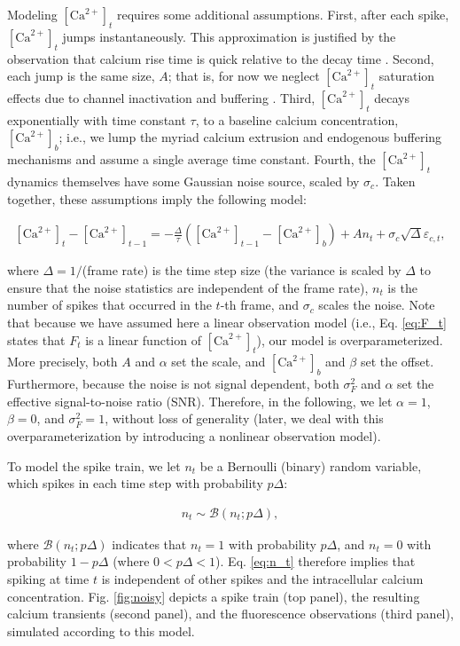 \documentclass[10pt]{article}
\newcommand{\Ca}{[\text{Ca}^{2+}]}
\begin{document}
Modeling $\Ca_t$ requires some additional assumptions. First, after each spike, $\Ca_t$ jumps instantaneously. This approximation is justified by the observation that calcium rise time is quick relative to the decay time \cite{YasudaSvoboda04, CornelisseMansvelder07}. Second, each jump is the same size, $A$; that is, for now we neglect $\Ca_t$ saturation effects due to channel inactivation and buffering \cite{RegehrAtluri95}. Third, $\Ca_t$ decays exponentially with time constant $\tau$, to a baseline calcium concentration, $\Ca_b$; i.e., we lump the myriad calcium extrusion and endogenous buffering mechanisms and assume a single average time constant. Fourth, the $\Ca_t$ dynamics themselves have some Gaussian noise source, scaled by $\sigma_c$. Taken together, these assumptions imply the following model:

\begin{align} \label{eq:C_t}
\Ca_t - \Ca_{t-1} = -\frac{\Delta}{\tau}(\Ca_{t-1}-\Ca_b) + A n_t + \sigma_c \sqrt{\Delta} \varepsilon_{c,t},%
\end{align}

\noindent where $\Delta=1/$(frame rate) is the time step size (the variance is scaled by $\Delta$ to ensure that the noise statistics are independent of the frame rate), $n_t$ is the number of spikes that occurred in the $t$-th frame, and $\sigma_c$ scales the noise. Note that because we have assumed here a linear observation model (i.e., Eq. \ref{eq:F_t} states that $F_t$ is a linear function of $\Ca_t$), our model is overparameterized. More precisely, both $A$ and $\alpha$ set the scale, and $\Ca_b$ and $\beta$ set the offset. Furthermore, because the noise is not signal dependent, both $\sigma_F^2$ and $\alpha$ set the effective signal-to-noise ratio (SNR).  Therefore, in the following, we let $\alpha=1$, $\beta=0$, and $\sigma_F^2=1$, without loss of generality (later, we deal with this overparameterization by introducing a nonlinear observation model). 

To model the spike train, we let $n_t$ be a Bernoulli (binary) random variable, which spikes in each time step with probability $p \Delta$:

\begin{align} \label{eq:n_t}
n_t \sim \mathcal{B}(n_t; p \Delta),
\end{align}

\noindent where $\mathcal{B}(n_t;p \Delta)$ indicates that $n_t=1$ with probability $p \Delta$, and $n_t=0$ with probability $1-p \Delta$ (where $0 <p \Delta < 1$). Eq. \ref{eq:n_t} therefore implies that spiking at time $t$ is independent of other spikes and the intracellular calcium concentration. Fig. \ref{fig:noisy} depicts a spike train (top panel), the resulting calcium transients (second panel), and the fluorescence observations (third panel), simulated according to this model.
\end{document}
